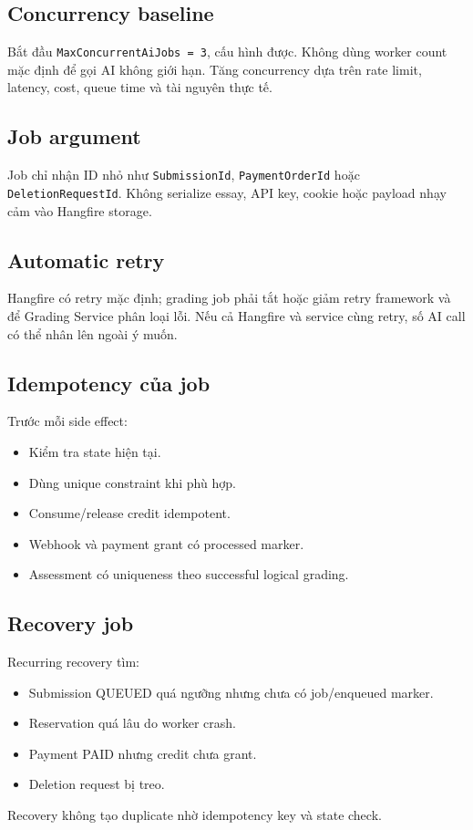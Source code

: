 \documentclass[11pt,a4paper]{article}
\begin{document}
\subsection{Concurrency baseline}
Bắt đầu \texttt{MaxConcurrentAiJobs = 3}, cấu hình được. Không dùng worker count mặc định để gọi AI không giới hạn. Tăng concurrency dựa trên rate limit, latency, cost, queue time và tài nguyên thực tế.

\subsection{Job argument}
Job chỉ nhận ID nhỏ như \texttt{SubmissionId}, \texttt{PaymentOrderId} hoặc \texttt{DeletionRequestId}. Không serialize essay, API key, cookie hoặc payload nhạy cảm vào Hangfire storage.

\subsection{Automatic retry}
Hangfire có retry mặc định; grading job phải tắt hoặc giảm retry framework và để Grading Service phân loại lỗi. Nếu cả Hangfire và service cùng retry, số AI call có thể nhân lên ngoài ý muốn.

\subsection{Idempotency của job}
Trước mỗi side effect:
\begin{itemize}
  \item Kiểm tra state hiện tại.
  \item Dùng unique constraint khi phù hợp.
  \item Consume/release credit idempotent.
  \item Webhook và payment grant có processed marker.
  \item Assessment có uniqueness theo successful logical grading.
\end{itemize}

\subsection{Recovery job}
Recurring recovery tìm:
\begin{itemize}
  \item Submission QUEUED quá ngưỡng nhưng chưa có job/enqueued marker.
  \item Reservation quá lâu do worker crash.
  \item Payment PAID nhưng credit chưa grant.
  \item Deletion request bị treo.
\end{itemize}
Recovery không tạo duplicate nhờ idempotency key và state check.
\end{document}
